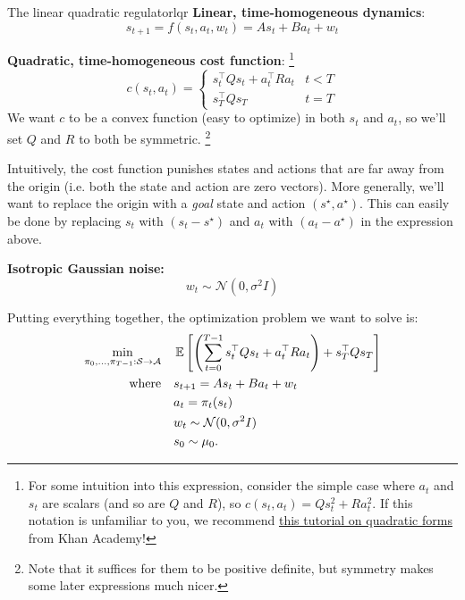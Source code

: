\documentclass[../main/main]{subfiles}
\begin{document}
\begin{definition}{The linear quadratic regulator}{lqr}
    \textbf{Linear, time-homogeneous dynamics}: \[
        s_{t+1} = f(s_t, a_t, w_t) = A s_t + B a_t + w_t
    \]

    \noindent \textbf{Quadratic, time-homogeneous cost function}:
    \footnote{For some intuition into this expression, consider the simple case where $a_t$ and $s_t$ are scalars (and so are $Q$ and $R$), so $c(s_t, a_t) = Q s_t^2 + R a_t^2$. If this notation is unfamiliar to you, we recommend \href{https://www.khanacademy.org/math/multivariable-calculus/applications-of-multivariable-derivatives/quadratic-approximations/v/expressing-a-quadratic-form-with-a-matrix}{this tutorial on quadratic forms} from Khan Academy!}
    \[
        c(s_t, a_t) = \begin{cases}
            s_t^\top Q s_t + a_t^\top R a_t & t < T \\
            s_T^\top Q s_T & t = T
        \end{cases}
    \]
    We want $c$ to be a convex function (easy to optimize) in both $s_t$ and $a_t$, so we'll set $Q$ and $R$ to both be symmetric. \footnote{Note that it suffices for them to be positive definite, but symmetry makes some later expressions much nicer.}

    Intuitively, the cost function punishes states and actions that are far away from the origin (i.e. both the state and action are zero vectors). More generally, we'll want to replace the origin with a \emph{goal} state and action $(s^\star, a^\star).$ This can easily be done by replacing $s_t$ with $(s_t - s^\star)$ and $a_t$ with $(a_t - a^\star)$ in the expression above.
    

    \noindent \textbf{Isotropic Gaussian noise:} \[ w_t \sim \mathcal{N}(0, \sigma^2 I) \]

    \noindent Putting everything together, the optimization problem we want to solve is:
    \begin{align*}
        \min_{\pi_0, \dots, \pi_{T-1} : \mathcal{S} \to \mathcal{A}} \quad & \operatorname*{\mathbb{E}} \left[ \left( \sum_{t=0}^{T-1} s_t^\top Q s_t + a_t^\top R a_t \right) + s_T^\top Q s_T \right] \\
        \textrm{where} \quad & s_{t+1} = A s_t + B a_t + w_t \\
        & a_t = \pi_t (s_t) \\
        & w_t \sim \mathcal{N}(0, \sigma^2 I) \\
        & s_0 \sim \mu_0.
    \end{align*}
\end{definition}
\end{document}
